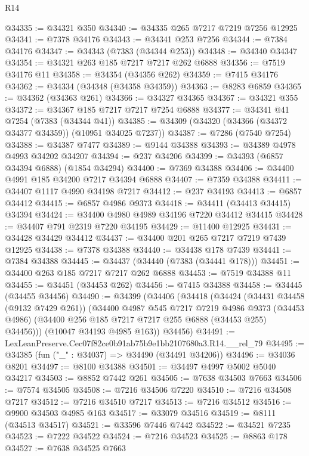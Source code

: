 \begin{lexlean}{R14}
\begin{coremodule}
@34335 := @34321 @350
@34340 := @34335 @265 @7217 @7219 @7256 @12925
@34341 := @7378 @34176
@34343 := @34341 @253 @7256
@34344 := @7384 @34176
@34347 := @34343 (@7383 (@34344 @253))
@34348 := @34340 @34347
@34354 := @34321 @263 @185 @7217 @7217 @262 @6888
@34356 := @7519 @34176 @11
@34358 := @34354 (@34356 @262)
@34359 := @7415 @34176
@34362 := @34334 (@34348 (@34358 @34359))
@34363 := @8283 @6859
@34365 := @34362 (@34363 @261)
@34366 := @34327 @34365
@34367 := @34321 @355
@34372 := @34367 @185 @7217 @7217 @7254 @6888
@34377 := @34341 @41 @7254 (@7383 (@34344 @41))
@34385 := @34309 (@34320 (@34366 (@34372 @34377 @34359)) (@10951 @34025 @7237))
@34387 := @7286 (@7540 @7254)
@34388 := @34387 @7477
@34389 := @9144 @34388
@34393 := @34389 @4978 @4993 @34202 @34207
@34394 := @237 @34206
@34399 := @34393 (@6857 @34394 @6888) (@1854 @34294)
@34400 := @7369 @34388
@34406 := @34400 @4991 @185 @34200 @7217 @34394 @6888
@34407 := @7359 @34388
@34411 := @34407 @1117 @4990 @34198 @7217
@34412 := @237 @34193
@34413 := @6857 @34412
@34415 := @6857 @4986 @9373
@34418 := @34411 (@34413 @34415) @34394
@34424 := @34400 @4980 @4989 @34196 @7220 @34412 @34415
@34428 := @34407 @791 @2319 @7220 @34195
@34429 := @11400 @12925
@34431 := @34428 @34429 @34412
@34437 := @34400 @201 @265 @7217 @7219 @7439 @12925
@34438 := @7378 @34388
@34440 := @34438 @178 @7439
@34441 := @7384 @34388
@34445 := @34437 (@34440 (@7383 (@34441 @178)))
@34451 := @34400 @263 @185 @7217 @7217 @262 @6888
@34453 := @7519 @34388 @11
@34455 := @34451 (@34453 @262)
@34456 := @7415 @34388
@34458 := @34445 (@34455 @34456)
@34490 := @34399
    (@34406
      (@34418
        (@34424
          (@34431 @34458 (@9132 @7429 @261))
          (@34400
            @4987
            @545
            @7217
            @7219
            @4986
            @9373
            (@34453 @4986)
            (@34400 @256 @185 @7217 @7217 @255 @6888 (@34453 @255) @34456)))
        (@10047 @34193 @4985 @163))
      @34456)
@34491 := LexLeanPreserve.Cec07f82ce0b91ab75b9e1bb2107680a3.R14.__rel_79
@34495 := @34385 (fun ("_" : @34037) => @34490 (@34491 @34206))
@34496 := @34036 @8201
@34497 := @8100 @34388
@34501 := @34497 @4997 @5002 @5040 @34217
@34503 := @8852 @7442 @261
@34505 := @7638 @34503 @7663
@34506 := @7574 @34505
@34508 := @7216 @34506 @7220
@34510 := @7216 @34508 @7217
@34512 := @7216 @34510 @7217
@34513 := @7216 @34512
@34516 := @9900 @34503 @4985 @163
@34517 := @33079 @34516
@34519 := @8111 (@34513 @34517)
@34521 := @33596 @7446 @7442
@34522 := @34521 @7235
@34523 := @7222 @34522
@34524 := @7216 @34523
@34525 := @8863 @178
@34527 := @7638 @34525 @7663

\end{coremodule}
\end{lexlean}
